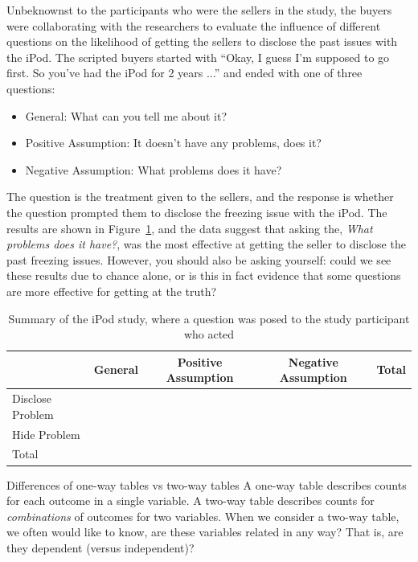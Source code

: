 Unbeknownst to the participants who were the sellers
in the study,
the buyers were collaborating with the researchers
to evaluate the influence of different questions
on the likelihood of getting the sellers to disclose
the past issues with the iPod.
The scripted buyers started with
``Okay, I guess I'm supposed to go first.
  So you've had the iPod for 2 years ...''
and ended with one of three questions:
\begin{itemize}
\item General: What can you tell me about it?
\item Positive Assumption: It doesn't have any problems, does it?
\item Negative Assumption: What problems does it have?
\end{itemize}
The question is the treatment given to the sellers,
and the response is whether the question prompted them
to disclose the freezing issue with the iPod.
The results are shown in Figure~\ref{ipod_ask_data_summary},
and the data suggest that asking the,
\emph{What problems does it have?},
was the most effective at getting the seller to disclose
the past freezing issues.
However, you should also be asking yourself:
could we see these results due to chance alone,
or is this in fact evidence that some questions
are more effective for getting at the truth?

\begin{table}[ht]
\centering
\begin{tabular}{l ccc l}
  \hline
  & General & Positive Assumption &
      Negative Assumption & Total \\ 
  \hline
  Disclose Problem & \iPodAA{} &  \iPodAB{} &
      \iPodAC{} & \iPodAD{} \\ 
  Hide Problem &  \iPodBA{} &  \iPodBB{} &
      \iPodBC{} & \iPodBD{} \\ 
  \hline
  Total & \iPodDA{} & \iPodDB{} &
      \iPodDC{} & \iPodDD{} \\
  \hline
\end{tabular}
\caption{Summary of the iPod study, where a question was
  posed to the study participant who acted}
\label{ipod_ask_data_summary}
\end{table}

\begin{onebox}{Differences of one-way tables vs two-way tables}
  A one-way table describes counts for each outcome in a single
  variable.
  A two-way table describes counts for \emph{combinations}
  of outcomes for two variables.
  When we consider a two-way table, we often would like to know,
  are these variables related in any way?
  That is, are they dependent (versus independent)?
\end{onebox}

